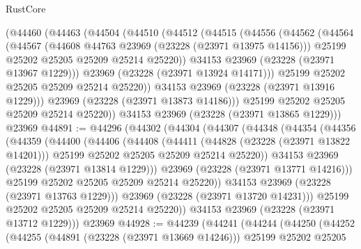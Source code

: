 \begin{lexlean}{RustCore}
\begin{coremodule}
      (@44460
        (@44463
          (@44504
            (@44510
              (@44512
                (@44515
                  (@44556
                    (@44562
                      (@44564
                        (@44567
                          (@44608 @44763 @23969 (@23228 (@23971 @13975 @14156)))
                          @25199
                          @25202
                          @25205
                          @25209
                          @25214
                          @25220))
                      @34153
                      @23969
                      (@23228 (@23971 @13967 @1229)))
                    @23969
                    (@23228 (@23971 @13924 @14171)))
                  @25199
                  @25202
                  @25205
                  @25209
                  @25214
                  @25220))
              @34153
              @23969
              (@23228 (@23971 @13916 @1229)))
            @23969
            (@23228 (@23971 @13873 @14186)))
          @25199
          @25202
          @25205
          @25209
          @25214
          @25220))
      @34153
      @23969
      (@23228 (@23971 @13865 @1229)))
    @23969
@44891 := @44296
    (@44302
      (@44304
        (@44307
          (@44348
            (@44354
              (@44356
                (@44359
                  (@44400
                    (@44406
                      (@44408
                        (@44411
                          (@44828 (@23228 (@23971 @13822 @14201)))
                          @25199
                          @25202
                          @25205
                          @25209
                          @25214
                          @25220))
                      @34153
                      @23969
                      (@23228 (@23971 @13814 @1229)))
                    @23969
                    (@23228 (@23971 @13771 @14216)))
                  @25199
                  @25202
                  @25205
                  @25209
                  @25214
                  @25220))
              @34153
              @23969
              (@23228 (@23971 @13763 @1229)))
            @23969
            (@23228 (@23971 @13720 @14231)))
          @25199
          @25202
          @25205
          @25209
          @25214
          @25220))
      @34153
      @23969
      (@23228 (@23971 @13712 @1229)))
    @23969
@44928 := @44239
    (@44241
      (@44244
        (@44250
          (@44252
            (@44255
              (@44891 (@23228 (@23971 @13669 @14246)))
              @25199
              @25202
              @25205

\end{coremodule}
\end{lexlean}
